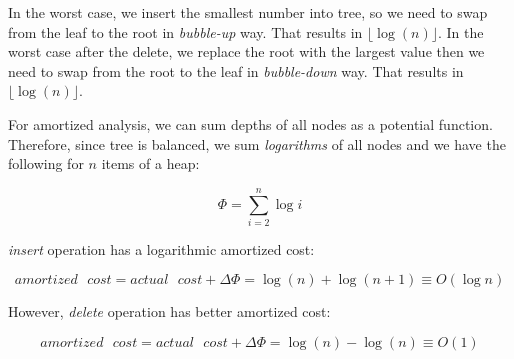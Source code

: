 In the worst case, we insert the smallest number into tree, so we need to swap from the leaf to the root in \textit{bubble-up} way. That results in $\lfloor \log(n) \rfloor $.
In the worst case after the delete, we replace the root with the largest value then we need to swap from the root to the leaf in \textit{bubble-down} way. That results in $\lfloor \log(n) \rfloor$.

For amortized analysis, we can sum depths of all nodes as a potential function. Therefore, since tree is balanced, we sum \textit{logarithms} of all nodes and we have the following for $n$ items of a heap:

  $$
    \Phi = \sum_{i=2}^{n} \log i
  $$

\textit{insert} operation has a logarithmic amortized cost:

  $$
    amortized\text{ }cost = actual\text{ }cost + \Delta\Phi = \log(n) + \log(n+1) \equiv O(\log n)
  $$
  
However, \textit{delete} operation has better amortized cost:

  $$
    amortized\text{ }cost = actual\text{ }cost + \Delta\Phi = \log(n) - \log(n) \equiv O(1)
  $$